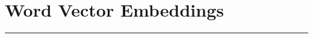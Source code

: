 \documentclass{article}
\begin{document}


\section*{Word Vector Embeddings}
\noindent\rule{\textwidth}{1pt}\vspace{0.75mm}



\end{document}
